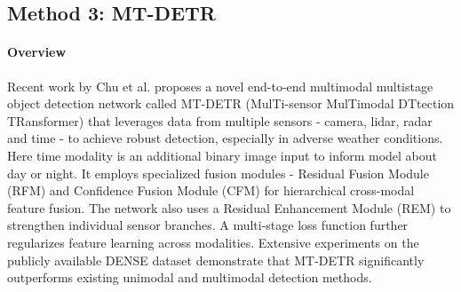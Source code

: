 \documentclass[report.tex]{subfiles}
\begin{document}
        

    
    \subsection{Method 3: MT-DETR}


    \paragraph*{Overview}
    
    Recent work by Chu et al. \cite{chu2023mt} proposes a novel end-to-end multimodal multistage object detection network called MT-DETR (MulTi-sensor MulTimodal DTtection TRansformer) that leverages data from multiple sensors - camera, lidar, radar and time - to achieve robust detection, especially in adverse weather conditions. Here time modality is an additional binary image input to inform model about day or night. It employs specialized fusion modules - Residual Fusion Module (RFM) and Confidence Fusion Module (CFM) for hierarchical cross-modal feature fusion. The network also uses a Residual Enhancement Module (REM) to strengthen individual sensor branches. A multi-stage loss function further regularizes feature learning across modalities. Extensive experiments on the publicly available DENSE \cite{bijelic2020seeing} dataset demonstrate that MT-DETR significantly outperforms existing unimodal and multimodal detection methods.
\end{document}
